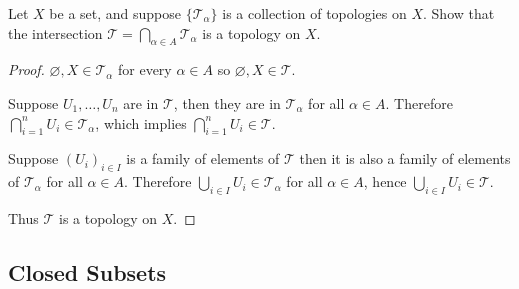 \begin{exercise}{2.6}
	Let $X$ be a set, and suppose ${\{ \mathscr{T}_{\alpha} \}}$ is a collection of topologies on $X$. Show that the intersection $\mathscr{T} = \bigcap_{\alpha\in A}\mathscr{T}_{\alpha}$ is a topology on $X$.
\end{exercise}

\begin{proof}
	$\varnothing, X\in \mathscr{T}_{\alpha}$ for every $\alpha\in A$ so $\varnothing, X\in \mathscr{T}$.

	Suppose $U_{1}, \ldots, U_{n}$ are in $\mathscr{T}$, then they are in $\mathscr{T}_{\alpha}$ for all $\alpha\in A$. Therefore $\bigcap^{n}_{i=1}U_{i} \in \mathscr{T}_{\alpha}$, which implies $\bigcap^{n}_{i=1}U_{i}\in \mathscr{T}$.

	Suppose ${(U_{i})}_{i\in I}$ is a family of elements of $\mathscr{T}$ then it is also a family of elements of $\mathscr{T}_{\alpha}$ for all $\alpha\in A$. Therefore $\bigcup_{i\in I}U_{i}\in \mathscr{T}_{\alpha}$ for all $\alpha\in A$, hence $\bigcup_{i\in I}U_{i} \in \mathscr{T}$.

	Thus $\mathscr{T}$ is a topology on $X$.
\end{proof}

\subsection*{Closed Subsets}

